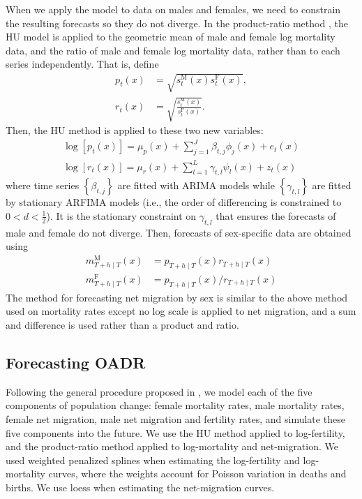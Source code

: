 \documentclass[11pt,a4paper,]{article}
\begin{document}
When we apply the \textcite{HU07} model to data on males and females, we need to constrain the resulting forecasts so they do not diverge. In the product-ratio method \autocite{HBY13}, the HU model is applied to the geometric mean of male and female log mortality data, and the ratio of male and female log mortality data, rather than to each series independently. That is, define
\begin{align}
  p_t(x)&=\sqrt{s_{t}^{\text{M}}(x)s_{t}^{\text{F}}(x)}, \label{eq:coherent_1}\\
  r_t(x)&=\sqrt{\frac{s_{t}^{\text{M}}(x)}{s_{t}^{\text{F}}(x)}}. \label{eq:coherent_2}
\end{align}
Then, the HU method is applied to these two new variables:
\begin{align*}
  \log[p_t(x)]=\mu_p(x)+\sum_{j=1}^{J}\beta_{t,j}\phi_j(x)+e_t(x)\\
  \log[r_t(x)]=\mu_r(x)+\sum_{l=1}^{L}\gamma_{t,l}\psi_l(x)+z_t(x)
\end{align*}
where time series \(\left\{\beta_{t,j}\right\}\) are fitted with ARIMA models while \(\left\{\gamma_{t,l}\right\}\) are fitted by stationary ARFIMA models (i.e., the order of differencing is constrained to \(0<d<\frac{1}{2}\)). It is the stationary constraint on \(\gamma_{t,l}\) that ensures the forecasts of male and female do not diverge. Then, forecasts of sex-specific data are obtained using
\begin{align*}
  m_{T+h\mid T}^{\text{M}}(x) & = p_{T+h\mid T}(x)r_{T+h\mid T}(x)\\
  m_{T+h\mid T}^{\text{F}}(x) & = p_{T+h\mid T}(x)/r_{T+h\mid T}(x)
\end{align*}
The method for forecasting net migration by sex is similar to the above method used on mortality rates except no log scale is applied to net migration, and a sum and difference is used rather than a product and ratio.

\hypertarget{forecasting-oadr}{%
\subsection{Forecasting OADR}\label{forecasting-oadr}}

Following the general procedure proposed in \textcite{HB08}, we model each of the five components of population change: female mortality rates, male mortality rates, female net migration, male net migration and fertility rates, and simulate these five components into the future. We use the HU method applied to log-fertility, and the product-ratio method applied to log-mortality and net-migration. We used weighted penalized splines \autocite{HU07} when estimating the log-fertility and log-mortality curves, where the weights account for Poisson variation in deaths and births. We use loess when estimating the net-migration curves.
\end{document}
